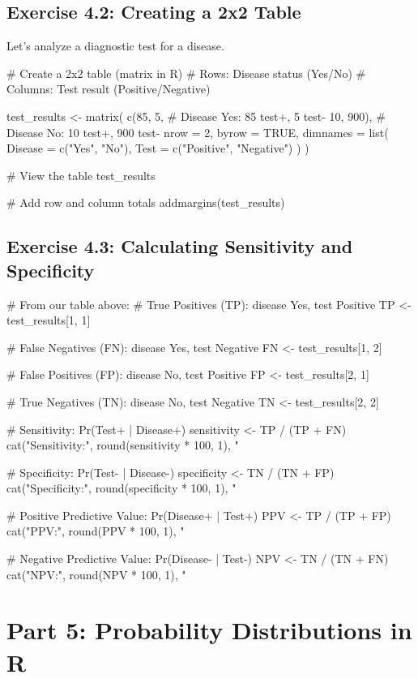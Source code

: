 \documentclass[11pt]{article}
\begin{document}
\subsection{Exercise 4.2: Creating a 2x2 Table}

Let's analyze a diagnostic test for a disease.

\begin{rcode}
# Create a 2x2 table (matrix in R)
# Rows: Disease status (Yes/No)
# Columns: Test result (Positive/Negative)

test_results <- matrix(
  c(85, 5,    # Disease Yes: 85 test+, 5 test-
    10, 900), # Disease No: 10 test+, 900 test-
  nrow = 2,
  byrow = TRUE,
  dimnames = list(
    Disease = c("Yes", "No"),
    Test = c("Positive", "Negative")
  )
)

# View the table
test_results

# Add row and column totals
addmargins(test_results)
\end{rcode}

\subsection{Exercise 4.3: Calculating Sensitivity and Specificity}

\begin{rcode}
# From our table above:
# True Positives (TP): disease Yes, test Positive
TP <- test_results[1, 1]

# False Negatives (FN): disease Yes, test Negative
FN <- test_results[1, 2]

# False Positives (FP): disease No, test Positive
FP <- test_results[2, 1]

# True Negatives (TN): disease No, test Negative
TN <- test_results[2, 2]

# Sensitivity: Pr(Test+ | Disease+)
sensitivity <- TP / (TP + FN)
cat("Sensitivity:", round(sensitivity * 100, 1), "%

# Specificity: Pr(Test- | Disease-)
specificity <- TN / (TN + FP)
cat("Specificity:", round(specificity * 100, 1), "%

# Positive Predictive Value: Pr(Disease+ | Test+)
PPV <- TP / (TP + FP)
cat("PPV:", round(PPV * 100, 1), "%

# Negative Predictive Value: Pr(Disease- | Test-)
NPV <- TN / (TN + FN)
cat("NPV:", round(NPV * 100, 1), "%
\end{rcode}

\section{Part 5: Probability Distributions in R}
\end{document}
